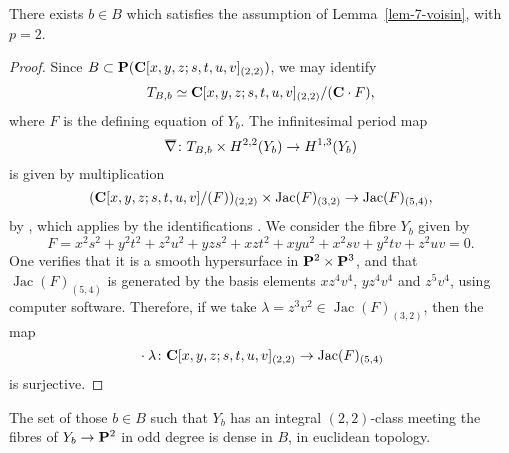 \begin{corollary}
    There exists $b \in B$ which satisfies the assumption of Lemma~\textup{\ref{lem-7-voisin}}, with $p=2$.
\end{corollary}

\begin{proof}
    Since $B \subset \bbP(\bbC[x,y,z;s,t,u,v]_{(2,2)})$, we may identify
    \[ T_{B,b} \simeq \bbC[x,y,z;s,t,u,v]_{(2,2)} / (\bbC \cdot F), \]
    where $F$ is the defining equation of $Y_b$.
    The infinitesimal period map
    \[ \nablabar \: T_{B,b} \times H^{2,2} (Y_b) \to H^{1,3} (Y_b) \]
    is given by multiplication
    \[ (\bbC[x,y,z;s,t,u,v]/(F))_{(2,2)} \times \operatorname{Jac} (F) _{(3,2)} 
        \to \operatorname{Jac} (F) _{(5,4)}, \]
    by \cite[Theorem~6.13]{voisin-book-2}, which applies by the identifications
    \cite[Corollary~10.2, Theorem~10.6, and Theorem~10.13]{batyrev-cox}.
    We consider the fibre $Y_b$ given by
    \[ F = x^2 s^2 + y^2 t^2 + z^2 u^2 + y z s^2 + x z t^2 + x y u^2
        + x^2 s v + y^2 t v + z^2 u v = 0. \]
    One verifies that it is a smooth hypersurface in $\bbP^2 \times \bbP^3$,
    and that $\operatorname{Jac} (F) _{(5,4)}$ is generated by the basis elements $xz^4v^4$, $yz^4v^4$ and $z^5v^4$,
    using computer software.
    Therefore, if we take $\lambda = z^3 v^2 \in \operatorname{Jac} (F) _{(3,2)}$, then the map
    \[ {} \cdot \lambda \: \bbC[x,y,z;s,t,u,v]_{(2,2)} \to \operatorname{Jac} (F) _{(5,4)} \]
    is surjective.
\end{proof}


\begin{theorem}
    The set of those $b \in B$ such that $Y_b$ has an integral $(2,2)$-class
    meeting the fibres of $Y_b \to \bbP^2$ in odd degree is dense in $B$, in euclidean topology.
\end{theorem}

